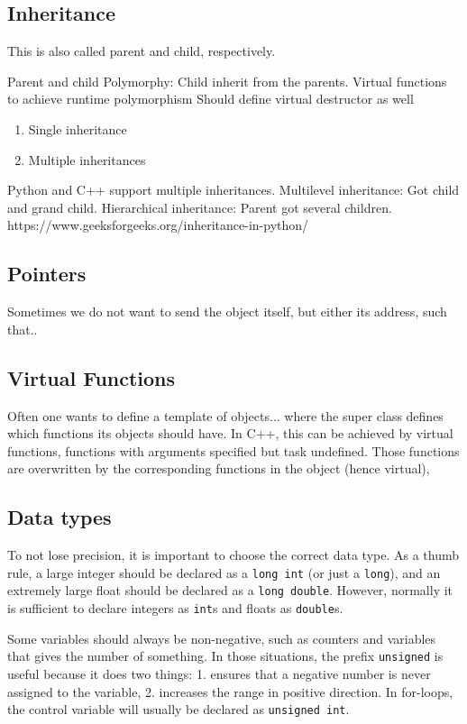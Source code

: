 \subsection{Inheritance}
This is also called parent and child, respectively. 

Parent and child
Polymorphy: Child inherit from the parents. 
Virtual functions to achieve runtime polymorphism 
Should define virtual destructor as well 

\begin{enumerate}
	\item Single inheritance
	\item Multiple inheritances
\end{enumerate}

Python and C++ support multiple inheritances. Multilevel inheritance: Got child and grand child. Hierarchical inheritance: Parent got several children. https://www.geeksforgeeks.org/inheritance-in-python/

\subsection{Pointers}
Sometimes we do not want to send the object itself, but either its address, such that..

\subsection{Virtual Functions}
Often one wants to define a template of objects... where the super class defines which functions its objects should have. In C++, this can be achieved by virtual functions, functions with arguments specified but task undefined. Those functions are overwritten by the corresponding functions in the object (hence virtual), 

\subsection{Data types}
To not lose precision, it is important to choose the correct data type. As a thumb rule, a large integer should be declared as a \texttt{long int} (or just a \texttt{long}), and an extremely large float should be declared as a \texttt{long double}. However, normally it is sufficient to declare integers as \texttt{int}s and floats as \texttt{double}s. 

Some variables should always be non-negative, such as counters and variables that gives the number of something. In those situations, the prefix \texttt{unsigned} is useful because it does two things: 1. ensures that a negative number is never assigned to the variable, 2. increases the range in positive direction. In for-loops, the control variable will usually be declared as \texttt{unsigned int}.

